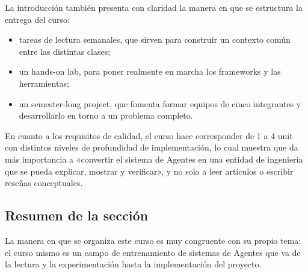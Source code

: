 La introducción también presenta con claridad la manera en que se estructura la entrega del curso:
\begin{itemize}
    \item tareas de lectura semanales, que sirven para construir un contexto común entre las distintas clases;
    \item un hands-on lab, para poner realmente en marcha los frameworks y las herramientas;
    \item un semester-long project, que fomenta formar equipos de cinco integrantes y desarrollarlo en torno a un problema completo.
\end{itemize}

En cuanto a los requisitos de calidad, el curso hace corresponder de 1 a 4 unit con distintos niveles de profundidad de implementación, lo cual muestra que da más importancia a «convertir el sistema de Agentes en una entidad de ingeniería que se pueda explicar, mostrar y verificar», y no solo a leer artículos o escribir reseñas conceptuales.

\subsection{Resumen de la sección}

La manera en que se organiza este curso es muy congruente con su propio tema: el curso mismo es un campo de entrenamiento de sistemas de Agentes que va de la lectura y la experimentación hasta la implementación del proyecto.

